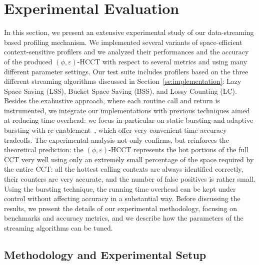 \documentclass{sigplanconf}
\begin{document}
\section{Experimental Evaluation}
\label{se:results}

In this section, we present an extensive experimental study of our data-streaming based profiling mechanism. We implemented several variants of space-efficient context-sensitive profilers and we analyzed their performances and the accuracy of the produced $(\phi,\varepsilon)$-HCCT with respect to several metrics and using many different parameter settings. Our test suite includes profilers based on the three different streaming algorithms discussed in Section~\ref{se:implementation}: Lazy Space Saving (LSS), Bucket Space Saving (BSS), and Lossy Counting (LC). Besides the exahustive approach, where each routine call and return is instrumented, we integrate our implementations with previous techniques aimed at reducing time overhead: we focus in particular on static bursting and adaptive bursting with re-enablement~\cite{ZSCC06}, which offer very convenient time-accuracy tradeoffs. The experimental analysis not only confirms, but reinforces the theoretical prediction: the $(\phi,\varepsilon)$-HCCT represents the hot portions of the full CCT very well using only an extremely small percentage of the space required by the entire CCT: all the hottest calling contexts are always identified correctly, their counters are very accurate, and the number of false positives is rather small. Using the bursting technique, the running time overhead can be kept under control without affecting accuracy in a substantial way. Before discussing the results, we present the details of our experimental methodology, focusing on benchmarks and accuracy metrics, and we describe how the parameters of the streaming algorithms can be tuned. 

\subsection{Methodology and Experimental Setup}
\label{ss:methodology}
\end{document}
